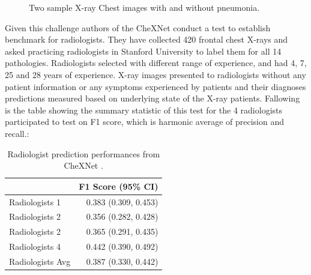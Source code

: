 \documentclass[12pt, twoside, a4paper]{article}
\begin{document}
\begin{figure}[H]%
    \centering
    \qquad
    \caption{Two sample X-ray Chest images with and without pneumonia.}%
    \label{fig:sample}%
\end{figure}
Given this challenge authors of the CheXNet conduct a test to establish benchmark for radiologists. They have collected 420 frontal chest X-rays and asked practicing radiologists in Stanford University to label them for all 14 pathologies. Radiologists selected with different range of experience, and had 4, 7, 25 and 28 years of experience. X-ray images presented to radiologists without any patient information or any symptoms experienced by patients and their diagnoses predictions measured based on underlying state of the X-ray patients. Fallowing is the table showing the summary statistic of this test for the 4 radiologists participated to test on F1 score, which is harmonic average of precision and recall.\cite{CheXNetRP}:
\begin{table}[h!]
    \centering
     \begin{tabular}{l r} 
     \hline
      & F1 Score (95\% CI) \\ [0.5ex] 
     \hline
     Radiologists 1 & 0.383 (0.309, 0.453) \\ 
     Radiologists 2 & 0.356 (0.282, 0.428) \\
     Radiologists 2 & 0.365 (0.291, 0.435) \\
     Radiologists 4 & 0.442 (0.390, 0.492) \\
     \hline
     Radiologists Avg & 0.387 (0.330, 0.442) \\ [1ex] 
     \hline
     \end{tabular}
     \caption{Radiologist prediction performances from CheXNet \cite{CheXNetRP}.}
     \label{table:radiologist}
\end{table}
\end{document}
